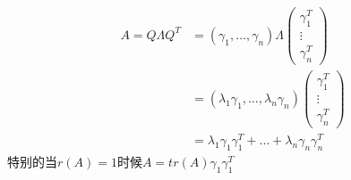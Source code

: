\documentclass[12pt, a4paper, oneside, UTF8]{ctexbook}
\begin{document}
\begin{definition}[方法]
\begin{enumerate}
\begin{enumerate}
\begin{align*}
                    A=Q\Lambda Q^T &=(\gamma_1,\ldots,\gamma_n)\Lambda \begin{pmatrix}
                        \gamma_1^T \\
                        \vdots \\
                        \gamma_n^T 
                    \end{pmatrix} \\
                    &=(\lambda_1\gamma_1,\ldots,\lambda_n\gamma_n)\begin{pmatrix}
                        \gamma_1^T \\
                        \vdots \\
                        \gamma_n^T 
                    \end{pmatrix} \\
                    &=\lambda_1\gamma_1\gamma_1^T+\ldots+\lambda_n\gamma_n\gamma_n^T
                \end{align*}
                特别的当$r(A)=1$时候$A=tr(A)\gamma_1\gamma_1^T$
            \end{enumerate}
    \end{enumerate}
\end{definition}
\end{document}
